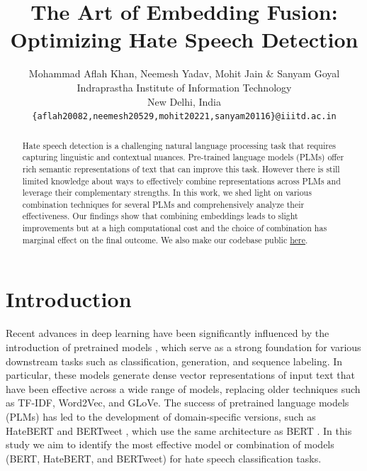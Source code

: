 \documentclass{article} %
\title{The Art of Embedding Fusion: Optimizing Hate Speech Detection}
\author{Mohammad Aflah Khan, Neemesh Yadav, Mohit Jain \& Sanyam Goyal \\
Indraprastha Institute of Information Technology\\
New Delhi, India \\
\texttt{\{aflah20082,neemesh20529,mohit20221,sanyam20116\}@iiitd.ac.in} \\
}
\begin{document}
\maketitle

\begin{abstract}
Hate speech detection is a challenging natural language processing task that requires capturing linguistic and contextual nuances. Pre-trained language models (PLMs) offer rich semantic representations of text that can improve this task. However there is still limited knowledge about ways to effectively combine representations across PLMs and leverage their complementary strengths. In this work, we shed light on various combination techniques for several PLMs and comprehensively analyze their effectiveness. Our findings show that combining embeddings leads to slight improvements but at a high computational cost and the choice of combination has marginal effect on the final outcome. We also make our codebase public \href{https://github.com/aflah02/The-Art-of-Embedding-Fusion-Optimizing-Hate-Speech-Detection}{here}.
\end{abstract}

\section{Introduction}

Recent advances in deep learning have been significantly influenced by the introduction of pretrained models \cite{zhou2023comprehensive}, which serve as a strong foundation for various downstream tasks such as classification, generation, and sequence labeling. In particular, these models generate dense vector representations of input text that have been effective across a wide range of models, replacing older techniques such as TF-IDF, Word2Vec, and GLoVe. The success of pretrained language models (PLMs) has led to the development of domain-specific versions, such as HateBERT \cite{caselli2020hatebert} and BERTweet \cite{nguyen-etal-2020-bertweet}, which use the same architecture as BERT \cite{devlin-etal-2019-bert}. In this study we aim to identify the most effective model or combination of models (BERT, HateBERT, and BERTweet) for hate speech classification tasks. 


\end{document}
